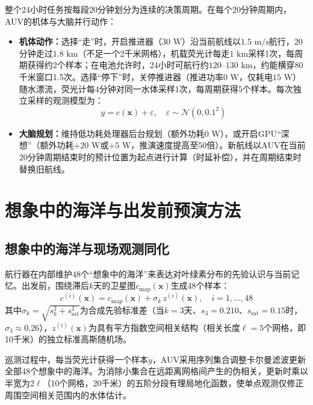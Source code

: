 整个24小时任务按每段20分钟划分为连续的决策周期。在每个20分钟周期内，AUV的机体与大脑并行动作\cite{xiao2020thinking, elboher2023formal}：
\begin{itemize}
  \item \textbf{机体动作：}选择“走”时，开启推进器（$30\text{ W}$）沿当前航线以$1.5\text{ m/s}$航行，20分钟走过$1.8\text{ km}$（不足一个2千米网格），机载荧光计每走$1\text{ km}$采样1次，每周期获得约2个样本；在电池允许时，24小时可航行约$120\text{--}130\text{ km}$，约能横穿80千米窗口1.5次。选择“停下”时，关停推进器（推进功率$0\text{ W}$，仅耗电$15\text{ W}$）随水漂流，荧光计每4分钟对同一水体采样1次，每周期获得5个样本。每次独立采样的观测模型为：
  \begin{equation}
    y = c(\mathbf{x}) + \varepsilon, \quad \varepsilon \sim \mathcal{N}(0, 0.1^2)
    \label{eq:obs}
  \end{equation}
  \item \textbf{大脑规划：}维持低功耗处理器后台规划（额外功耗$0\text{ W}$），或开启GPU“深想”（额外功耗$+20\text{ W}$或$+5\text{ W}$，推演速度提高至50倍）。新航线以AUV在当前20分钟周期结束时的预计位置为起点进行计算（时延补偿），并在周期结束时替换旧航线。
\end{itemize}

\section{想象中的海洋与出发前预演方法}

\subsection{想象中的海洋与现场观测同化}

航行器在内部维护48个“想象中的海洋”来表达对叶绿素分布的先验认识与当前记忆。出发前，围绕滞后$k$天的卫星图$c_{\text{map}}(\mathbf{x})$生成48个样本：
\begin{equation}
  c^{(i)}(\mathbf{x}) = c_{\text{map}}(\mathbf{x}) + \sigma_k\, z^{(i)}(\mathbf{x}), \quad i = 1, \dots, 48
  \label{eq:prior}
\end{equation}
其中$\sigma_k = \sqrt{s_k^2 + s_{\text{sat}}^2}$为合成先验标准差（当$k=3$天、$s_3=0.210$、$s_{\text{sat}}=0.15$时，$\sigma_3 \approx 0.26$），$z^{(i)}(\mathbf{x})$为具有平方指数空间相关结构（相关长度$\ell = 5$个网格，即10千米）的独立标准高斯随机场。

巡测过程中，每当荧光计获得一个样本$y$，AUV采用序列集合调整卡尔曼滤波\cite{anderson2001eakf}更新全部48个想象中的海洋。为消除小集合在远距离网格间产生的伪相关，更新时乘以半宽为$2\ell$（10个网格，20千米）的五阶分段有理局地化函数\cite{gaspari1999correlation}，使单点观测仅修正周围空间相关范围内的水体估计。


